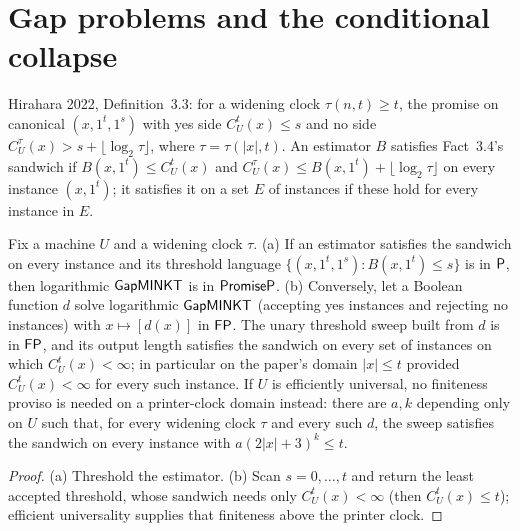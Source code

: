 \section{Gap problems and the conditional collapse}

\begin{definition}
  \label{def:avg-gapminkt-log}
  \leanok
  Hirahara 2022, Definition~3.3: for a widening clock $\tau(n, t) \ge t$, the
  promise on canonical $(x, 1^t, 1^s)$ with yes side $C^t_U(x) \le s$ and no
  side $C^{\tau}_U(x) > s + \lfloor \log_2 \tau \rfloor$, where $\tau =
  \tau(|x|, t)$. An estimator $B$ satisfies Fact~3.4's sandwich if $B(x, 1^t)
  \le C^t_U(x)$ and $C^{\tau}_U(x) \le B(x, 1^t) + \lfloor \log_2 \tau
  \rfloor$ on every instance $(x, 1^t)$; it satisfies it on a set $E$ of
  instances if these hold for every instance in $E$.
\end{definition}

\begin{theorem}
  \label{thm:avg-fact34}
  \leanok
  Fix a machine $U$ and a widening clock $\tau$. (a) If an estimator satisfies
  the sandwich on every instance and its threshold language
  $\{(x,1^t,1^s) : B(x,1^t) \le s\}$ is in $\mathsf{P}$, then logarithmic
  $\mathsf{GapMINKT}$ is in $\mathsf{PromiseP}$. (b) Conversely, let a Boolean
  function $d$ solve logarithmic $\mathsf{GapMINKT}$ (accepting yes instances and
  rejecting no instances) with $x \mapsto [d(x)]$ in $\mathsf{FP}$. The unary
  threshold sweep built from $d$ is in $\mathsf{FP}$, and its output length
  satisfies the sandwich on every set of instances on which $C^t_U(x) <
  \infty$; in particular on the paper's domain $|x| \le t$ provided
  $C^t_U(x) < \infty$ for every such instance. If $U$ is efficiently universal,
  no finiteness proviso is needed on a printer-clock domain instead: there are
  $a, k$ depending only on $U$ such that, for every widening clock $\tau$ and
  every such $d$, the sweep satisfies the sandwich on every instance with
  $a(2|x|+3)^k \le t$.
\end{theorem}
\begin{proof}
  \leanok
  (a) Threshold the estimator. (b) Scan $s = 0, \dots, t$ and return the least
  accepted threshold, whose sandwich needs only $C^t_U(x) < \infty$ (then
  $C^t_U(x) \le t$); efficient universality supplies that finiteness above the
  printer clock.
\end{proof}

